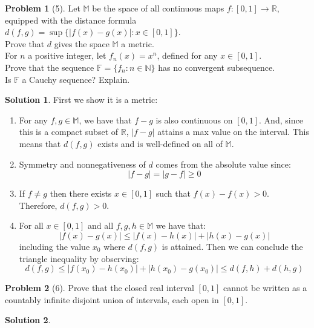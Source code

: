 \documentclass{article}
\theoremstyle{definition}
\newtheorem*{soln}{Solution}
\newtheorem*{prob}{Problem}
\theoremstyle{theorem}
\newcommand{\R}{\mathbb{R}}
\newcommand{\M}{\mathbb{M}}
\begin{document}
\begin{prob}[5]
Let $\mathbb{M}$ be the space of all continuous maps $f:[0, 1] \rightarrow \mathbb{R}$, equipped with the distance formula $d(f,g ) =  \sup\{ |f(x) - g(x)|:  x \in [0, 1]\}$.  \\Prove that $d$ gives the space $\mathbb{M}$ a metric.   \\For $n$ a positive integer, let $f_n(x) = x^n$, defined for any $x\in [0, 1]$. \\ Prove that the sequence $\mathbb{F} = \{f_n: n \in \mathbb{N}\}$ has no convergent subsequence. \\ Is $\mathbb{F}$ a Cauchy sequence? Explain. 
\end{prob}
\begin{soln}
First we show it is a metric:
    \begin{enumerate}
        \item For any $f,g\in \M$, we have that $f-g$ is also continuous on $[0,1]$. And, since this is a compact subset of $\R$, $|f-g|$ attains a max value on the interval. This means that $d(f,g)$ exists and is well-defined on all of $\M$. 
        \item Symmetry  and nonnegativeness of $d$ comes from the absolute value since:
            $$|f-g| = |g-f|\geq 0$$
        \item  If $f\neq g$ then there exists $x\in [0,1]$ such that $f(x)-f(x)>0$. Therefore, $d(f,g)>0$. 
        \item For all $x\in [0,1]$ and all $f,g,h\in \M$ we have that:
            $$|f(x) - g(x)| \leq |f(x)-h(x)| + | h(x) - g(x)|$$
            including the value  $x_0$ where $d(f,g)$ is attained. Then we can conclude the triangle inequality by observing:
            $$d(f,g) \leq |f(x_0) - h(x_0)| + | h(x_0) - g(x_0)| \leq d(f,h) + d(h,g)$$
    \end{enumerate}
\end{soln}
\vspace{1in}


\begin{prob}[6]
Prove that the closed real interval $[0, 1]$ cannot be written as a countably infinite disjoint union of intervals, each open in $[0, 1]$. 
\end{prob}
\begin{soln}

\end{soln}
\vspace{1in}
\end{document}
